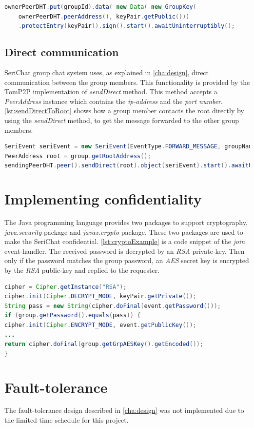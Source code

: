 \begin{lstlisting}[language=java,frame=tblr,caption={Entry signing by the group owner},label=lst:signingEntry]
ownerPeerDHT.put(groupId).data( new Data( new GroupKey(
	ownerPeerDHT.peerAddress(), keyPair.getPublic()))
	.protectEntry(keyPair)).sign().start().awaitUninterruptibly();
\end{lstlisting}

\subsection{Direct communication}
SeriChat group chat system uses, as explained in \autoref{cha:design}, direct communication between the group members. This functionality is provided by the TomP2P implementation of \emph{sendDirect} method. This method accepts a \emph{PeerAddress} instance which contains the \emph{ip-address} and the \emph{port number}. \autoref{lst:sendDirectToRoot} shows how a group member contacts the root directly by using the \emph{sendDirect} method, to get the message forwarded to the other group members.
\begin{lstlisting}[language=java,frame=tblr,caption={Sending direct to the root},label=lst:sendDirectToRoot]
SeriEvent seriEvent = new SeriEvent(EventType.FORWARD_MESSAGE, groupName, msgBytes, nickName);
PeerAddress root = group.getRootAddress();
sendingPeerDHT.peer().sendDirect(root).object(seriEvent).start().awaitUninterruptibly();
\end{lstlisting}

\section{Implementing confidentiality}
The Java programming language provides two packages to support cryptography, \emph{java.security} package and \emph{javax.crypto} package. These two packages are used to make the SeriChat confidential. \autoref{lst:cryptoExample} is a code snippet of the \emph{join} event-handler. The received password is decrypted by an \emph{RSA} private-key. Then only if the password matches the group password, an \emph{AES} secret key is encrypted by the \emph{RSA} public-key and replied to the requester.
\begin{lstlisting}[language=java,frame=tblr,caption={Example of \emph{java.security} and \emph{javax.crypto} usage},label=lst:cryptoExample]
cipher = Cipher.getInstance("RSA");
cipher.init(Cipher.DECRYPT_MODE, keyPair.getPrivate());
String pass = new String(cipher.doFinal(event.getPassword()));
if (group.getPassword().equals(pass)) {
cipher.init(Cipher.ENCRYPT_MODE, event.getPublicKey());
...
return cipher.doFinal(group.getGrpAESKey().getEncoded());
}
\end{lstlisting}

\section{Fault-tolerance}
The fault-tolerance design described in \autoref{cha:design} was not implemented due to the limited time schedule for this project.

